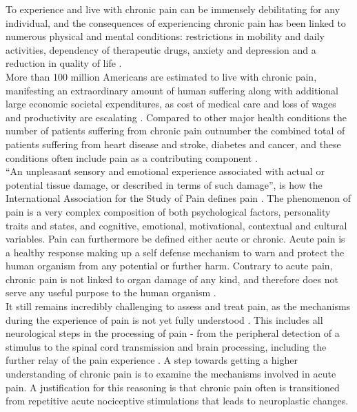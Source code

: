 To experience and live with chronic pain can be immensely debilitating for any individual, and the consequences of experiencing chronic pain has been linked to numerous physical and mental conditions: restrictions in mobility and daily activities, dependency of therapeutic drugs, anxiety and depression and a reduction in quality of life \cite{Dahlhamer2018,NationalCenterforHealthStatisticsHealth2011}. \\ More than 100 million Americans are estimated to live with chronic pain, manifesting an extraordinary amount of human suffering along with additional large economic societal expenditures, as cost of medical care and loss of wages and productivity are escalating  \cite{InstituteofMedicine2011,Davis2017}. Compared to other major health conditions the number of patients suffering from chronic pain outnumber the combined total of patients suffering from heart disease and stroke, diabetes and cancer, and these conditions often include pain as a contributing component \cite{NationalCenterforHealthStatisticsHealth2011}. \\
“An unpleasant sensory and emotional experience associated with actual or potential tissue damage, or described in terms of such damage”, is how the International Association for the Study of Pain defines pain \cite{Merskey1994}. The phenomenon of pain is a very complex composition of both psychological factors, personality traits and states, and cognitive, emotional, motivational, contextual and cultural variables. Pain can furthermore be defined either acute or chronic. Acute pain is a healthy response making up a self defense mechanism to warn and protect the human organism from any potential or further harm. \cite{Brook2011,Garland2013,Davis2017} Contrary to acute pain, chronic pain is not linked to organ damage of any kind, and therefore does not serve any useful purpose to the human organism \cite{Schmidt1986}. \\
It still remains incredibly challenging to assess and treat pain, as the mechanisms during the experience of pain is not yet fully understood \cite{Nielsen2008,Coghill2011}. This includes all neurological steps in the processing of pain - from the peripheral detection of a stimulus to the spinal cord transmission and brain processing, including the further relay of the pain experience \cite{Feizerfan2015}. A step towards getting a higher understanding of chronic pain is to examine the mechanisms involved in acute pain. A justification for this reasoning is that chronic pain often is transitioned from repetitive acute nociceptive stimulations that leads to neuroplastic changes. \cite{Feizerfan2015, Mcgreevy2012}\\
